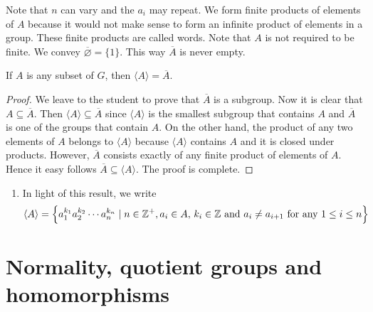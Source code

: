 \documentclass[11pt,a4paper]{article}
\begin{document}
Note that \(n\) can vary and the \(a_i\) may repeat.
We form finite products of elements of \(A\) because it would not make sense to form an infinite product of elements in a group.
These  finite products are called words.
Note that \(A\) is not required to be finite.
We convey \(\overline{\varnothing} = \{1\}\).
This way \(\overline{A}\) is never empty.

\begin{prop}
    If \(A\) is any subset of \(G\), then 
    \(\langle A\rangle = \overline{A}\).
\end{prop}

\begin{proof}
    We leave to the student to prove that \(\overline{A}\)  is a subgroup.
    Now it is clear that  \(A\subseteq \overline{A}\).
    Then  \(\langle A\rangle \subseteq \overline{A}\) since  \(\langle A\rangle\) is the smallest subgroup that contains \(A\) and \(\overline{A}\) is one of the  groups that contain \(A\).
    On the other hand, the product of any two elements of \(A\) belongs to \(\langle A\rangle\) because \(\langle A\rangle\) contains  \(A\) and it is closed under products.
    However, \(\overline{A}\) consists exactly of any finite product of elements of \(A\).
    Hence it easy follows \(\overline{A}\subseteq \langle A\rangle\).
    The proof is complete.
\end{proof}


\begin{rem}
\begin{enumerate}[label=(\roman*)]
\item In light of this result, we write 
\[\langle A \rangle = \left\{ a_1^{k_1} a_2^{k_2} \cdots a_{n}^{k_n} \mid n\in \mathbb{Z}^+, a_i \in A ,\, k_i \in \mathbb{Z} \text{ and } a_i\neq a_{i+1} \text{ for any } 1 \leq i\leq  n \right\}\]

\end{enumerate}
    
\end{rem}

\section{Normality, quotient groups and homomorphisms}
\end{document}
